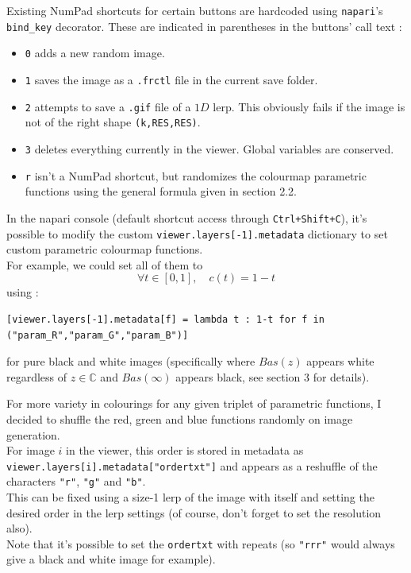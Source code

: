 \documentclass{article}
\newcommand\C{\mathbb{C}}
\begin{document}
Existing NumPad shortcuts for certain buttons are hardcoded using \texttt{napari}'s \texttt{bind\_key} decorator. These are indicated in parentheses in the buttons' call text : \\
\begin{itemize}
\item \texttt{0} adds a new random image. \\
\item \texttt{1} saves the image as a \texttt{.frctl} file in the current save folder. \\
\item \texttt{2} attempts to save a \texttt{.gif} file of a $1D$ lerp. This obviously fails if the image is not of the right shape \texttt{(k,RES,RES)}. \\
\item \texttt{3} deletes everything currently in the viewer. Global variables are conserved. \\
\item \texttt{r} isn't a NumPad shortcut, but randomizes the colourmap parametric functions using the general formula given in section 2.2.
\end{itemize}

In the napari console (default shortcut access through \texttt{Ctrl+Shift+C}), it's possible to modify the custom \texttt{viewer.layers[-1].metadata} dictionary to set custom parametric colourmap functions. \\
For example, we could set all of them to 
$$\forall t \in [0,1], \quad c(t) = 1-t$$
using : \\
\begin{lstlisting}
[viewer.layers[-1].metadata[f] = lambda t : 1-t for f in ("param_R","param_G","param_B")]
\end{lstlisting}
\vspace{-5mm}
for pure black and white images (specifically where $Bas(z)$ appears white regardless of $z \in \C$ and $Bas(\infty)$ appears black, see \cite{Sut14} section 3 for details). \\
\vspace{5mm}

For more variety in colourings for any given triplet of parametric functions, I decided to shuffle the red, green and blue functions randomly on image generation. \\
\vspace{2mm}
For image $i$ in the viewer, this order is stored in metadata as \texttt{viewer.layers[i].metadata["ordertxt"]} and appears as a reshuffle of the characters \texttt{"r"}, \texttt{"g"} and \texttt{"b"}. \\
\vspace{2mm}
This can be fixed using a size-1 lerp of the image with itself and setting the desired order in the lerp settings (of course, don't forget to set the resolution also). \\
\vspace{2mm}
Note that it's possible to set the \texttt{ordertxt} with repeats (so \texttt{"rrr"} would always give a black and white image for example).












\end{document}
